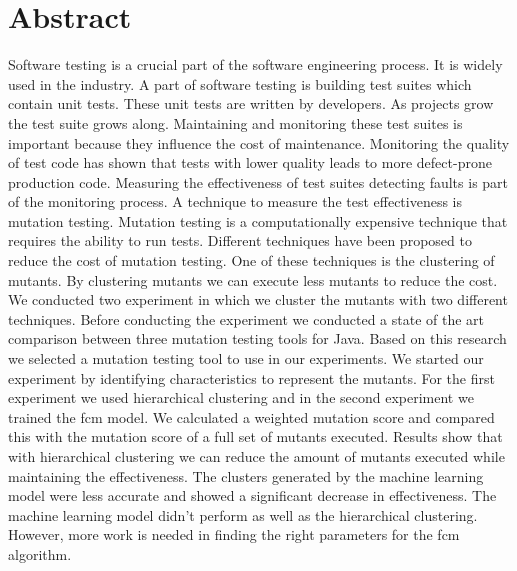 \documentclass[../main]{subfiles}
\begin{document}
\chapter*{Abstract}
Software testing is a crucial part of the software engineering process. 
It is widely used in the industry.
A part of software testing is building test suites which contain unit tests.
These unit tests are written by developers. 
As projects grow the test suite grows along.
Maintaining and monitoring these test suites is important because they influence the cost of maintenance.
Monitoring the quality of test code has shown that tests with lower quality leads to more defect-prone production code.
\newline
Measuring the effectiveness of test suites detecting faults is part of the monitoring process.
A technique to measure the test effectiveness is mutation testing.
Mutation testing is a computationally expensive technique that requires the ability to run tests.
Different techniques have been proposed to reduce the cost of mutation testing.
One of these techniques is the clustering of mutants.
By clustering mutants we can execute less mutants to reduce the cost.
\newline
We conducted two experiment in which we cluster the mutants with two different techniques.
Before conducting the experiment we conducted a state of the art comparison between three mutation testing tools for Java.
Based on this research we selected a mutation testing tool to use in our experiments.
\newline
We started our experiment by identifying characteristics to represent the mutants.
For the first experiment we used hierarchical clustering and in the second experiment we trained the \acrlong{fcm} model.
We calculated a weighted mutation score and compared this with the mutation score of a full set of mutants executed.
Results show that with hierarchical clustering we can reduce the amount of mutants executed while maintaining the effectiveness.
The clusters generated by the machine learning model were less accurate and showed a significant decrease in effectiveness.
The machine learning model didn't perform as well as the hierarchical clustering.
However, more work is needed in finding the right parameters for the \acrlong{fcm} algorithm. 
\end{document}
